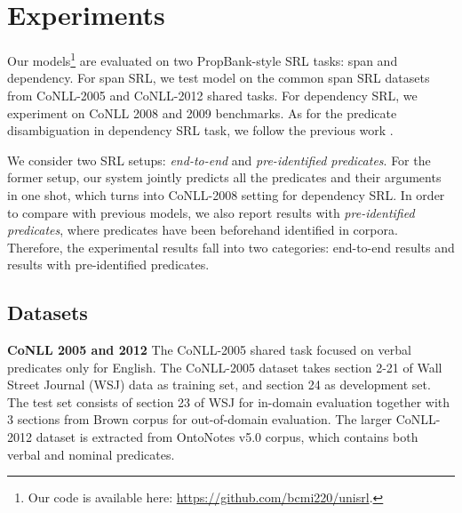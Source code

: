\documentclass[letterpaper]{article} %
\begin{document}
\section{Experiments}
Our models\footnote{Our code is available here: \url{https://github.com/bcmi220/unisrl}.} are evaluated on two PropBank-style SRL tasks: span and dependency. For span SRL, we test model on the common span SRL datasets from CoNLL-2005 \cite{CoNLL2005} and CoNLL-2012 \cite{CoNLL2013} shared tasks. For dependency SRL, we experiment on CoNLL 2008 \cite{surdeanu-EtAl2008} and 2009 \cite{hajivc-EtAl2009} benchmarks. As for the predicate disambiguation in dependency SRL task, we follow the previous work \cite{roth2016}.

We consider two SRL setups: \textit{end-to-end} and \textit{pre-identified predicates}. 
For the former setup, our system jointly predicts all the predicates and their arguments in one shot, which turns into CoNLL-2008 setting for dependency SRL. In order to compare with previous models, we also report results with \textit{pre-identified predicates}, where predicates have been beforehand identified in corpora. Therefore, the experimental results fall into two categories: end-to-end results and results with pre-identified predicates. 


\subsection{Datasets}

\noindent \textbf{CoNLL 2005 and 2012} \quad The CoNLL-2005 shared task focused on verbal predicates only for English.
The CoNLL-2005 dataset takes section 2-21 of Wall Street Journal (WSJ) data as training set, and section 24 as development set. The test set consists of section 23 of WSJ for in-domain evaluation together with 3 sections from Brown corpus for out-of-domain evaluation. The larger CoNLL-2012 dataset is extracted from OntoNotes v5.0 corpus, which contains both verbal and nominal predicates.
\end{document}
